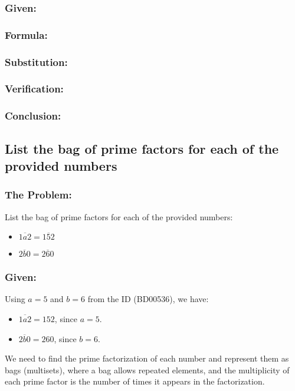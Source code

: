 \documentclass[12pt, a4paper, twoside]{report} %
\begin{document}
\subsubsection*{Given:}
\subsubsection*{Formula:}
\subsubsection*{Substitution:}
\subsubsection*{Verification:}
\subsubsection*{Conclusion:}

\subsection{List the bag of prime factors for each of the provided numbers}

\subsubsection*{The Problem:}
List the bag of prime factors for each of the provided numbers:
\begin{itemize}
  \item \(\overline{1a2} = \overline{152}\)
  \item \(\overline{2b0} = \overline{260}\)
\end{itemize}

\subsubsection*{Given:}
Using \( a = 5 \) and \( b = 6 \) from the ID (BD00536), we have:
\begin{itemize}
  \item \(\overline{1a2} = 152\), since \( a = 5 \).
  \item \(\overline{2b0} = 260\), since \( b = 6 \).
\end{itemize}
We need to find the prime factorization of each number and represent them as bags (multisets), where a bag allows repeated elements, and the multiplicity of each prime factor is the number of times it appears in the factorization.
\end{document}
